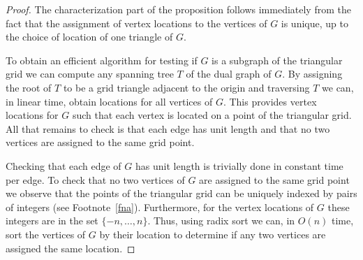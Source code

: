 \documentclass{article}
\begin{document}
\begin{proof}
The characterization part of the proposition follows immediately from
the fact that the assignment of vertex locations to the vertices of
$G$ is unique, up to the choice of location of one triangle of $G$.

To obtain an efficient algorithm for testing if $G$ is a subgraph of
the triangular grid  we can compute any spanning tree $T$ of the dual
graph of $G$. By assigning the root of $T$ to be a grid triangle
adjacent to the origin and traversing $T$ we can, in linear time,
obtain locations for all vertices of $G$.  This provides vertex
locations for $G$ such that each vertex is located on a point of the
triangular grid.  All that remains to check is that each edge has unit
length and that no two vertices are assigned to the same grid point.

Checking that each edge of $G$ has unit length is trivially done in
constant time per edge.  To check that no two vertices of $G$ are
assigned to the same grid point we observe that the points of the
triangular grid can be uniquely indexed by pairs of integers (see
Footnote~\ref{fna}).  Furthermore, for the vertex locations of $G$ these
integers are in the set $\{-n,\ldots,n\}$.  Thus, using radix sort we
can, in $O(n)$ time, sort the vertices of $G$ by their location to
determine if any two vertices are assigned the same location.
\end{proof}
\end{document}
